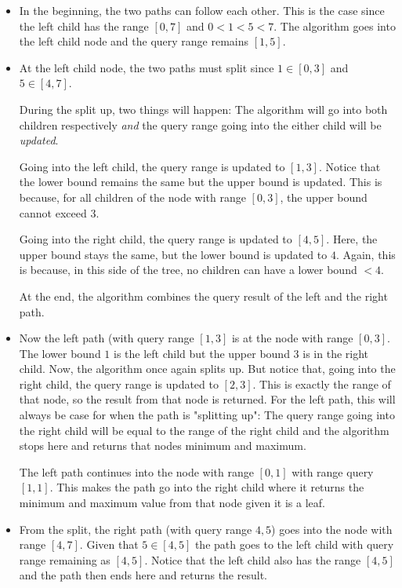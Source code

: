 \begin{itemize}
    \item In the beginning, the two paths can follow each other. This is the
    case since the left child has the range $[0,7]$ and $0 < 1 < 5 < 7$. The
    algorithm goes into the left child node and the query range remains $[1,5]$. 

    \item At the left child node, the two paths must split since $1 \in [0,3]$
    and $5 \in [4,7]$. 

    During the split up, two things will happen: The algorithm will go into both
    children respectively \textit{and} the query range going into the either
    child will be \textit{updated}.

    Going into the left child, the query range is updated to $[1,3]$. Notice
    that the lower bound remains the same but the upper bound is
    updated. This is because, for all children of the node with range $[0,3]$,
    the upper bound cannot exceed $3$. 

    Going into the right child, the query range is updated to $[4,5]$. Here, the
    upper bound stays the same, but the lower bound is updated to $4$. Again,
    this is because, in this side of the tree, no children can have a lower
    bound $< 4$. 

    At the end, the algorithm combines the query result of the left and the
    right path. 

    \item Now the left path (with query range $[1,3]$ is at the node with range
    $[0,3]$. The lower bound $1$ is the left child but the upper bound $3$ is in
    the right child. Now, the algorithm once again splits up. But notice that,
    going into the right child, the query range is updated to $[2,3]$. This is
    exactly the range of that node, so the result from that node is returned.
    For the left path, this will always be case for when the path is "splitting
    up": The query range going into the right child will be equal to the range
    of the right child and the algorithm stops here and returns that nodes
    minimum and maximum. 

    The left path continues into the node with range $[0,1]$ with range query
    $[1,1]$. This makes the path go into the right child where it returns the
    minimum and maximum value from that node given it is a leaf. 

    \item From the split, the right path (with query range $4,5$) goes into the
    node with range $[4,7]$. Given that $5 \in [4,5]$ the path goes to the left
    child with query range remaining as $[4,5]$. Notice that the left child also
    has the range $[4,5]$ and the path then ends here and returns the result. 

\end{itemize}

